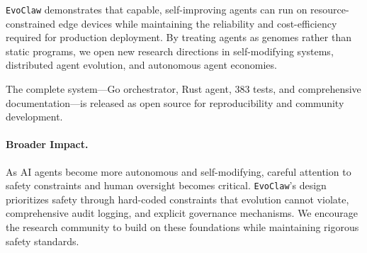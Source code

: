 \documentclass[conference]{IEEEtran}
\newcommand{\evoclaw}{\texttt{EvoClaw}\xspace}
\begin{document}
\evoclaw{} demonstrates that capable, self-improving agents can run on resource-constrained edge devices while maintaining the reliability and cost-efficiency required for production deployment. By treating agents as genomes rather than static programs, we open new research directions in self-modifying systems, distributed agent evolution, and autonomous agent economies.

The complete system—Go orchestrator, Rust agent, 383 tests, and comprehensive documentation—is released as open source for reproducibility and community development.

\paragraph{Broader Impact.} As AI agents become more autonomous and self-modifying, careful attention to safety constraints and human oversight becomes critical. \evoclaw{}'s design prioritizes safety through hard-coded constraints that evolution cannot violate, comprehensive audit logging, and explicit governance mechanisms. We encourage the research community to build on these foundations while maintaining rigorous safety standards.







\end{document}
